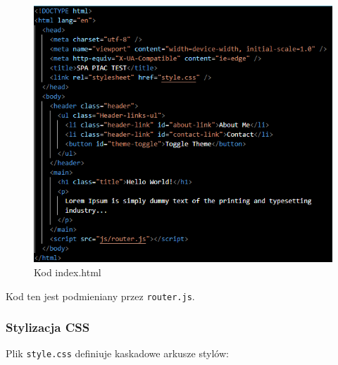 \documentclass[a4paper,12pt]{article}
\begin{document}
\begin{figure}[H]
    \centering
    \includegraphics[width=1\textwidth]{images/index_html.png}
    \caption{Kod index.html}
\end{figure}

Kod ten jest podmieniany przez \texttt{router.js}.

\subsubsection{Stylizacja CSS}
Plik \texttt{style.css} definiuje kaskadowe arkusze stylów:
\end{document}
